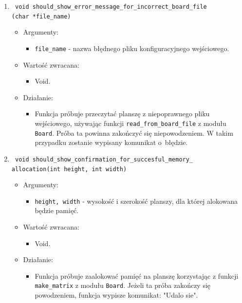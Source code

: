 \documentclass[a4paper,11pt, notitlepage ]{article}
\begin{document}
\begin{enumerate}
\item \verb+ void should_show_error_message_for_incorrect_board_file+ \\\verb+(char *file_name)+
\begin{itemize}
\item Argumenty:
\begin{itemize}
\item \verb+file_name+ - nazwa błędnego pliku konfiguracyjnego wejściowego.
\end{itemize}
\item Wartość zwracana:
\begin{itemize}
\item Void.
\end{itemize}
\item Działanie:
\begin{itemize}
\item Funkcja próbuje przeczytać planszę z niepoprawnego pliku wejściowego, używając funkcji \verb+read_from_board_file+ z modułu \verb+Board+. Próba ta powinna zakończyć się niepowodzeniem. W takim przypadku zostanie wypisany komunikat o~błędzie.
\end{itemize}
\end{itemize}


\item \verb+ void should_show_confirmation_for_succesful_memory_+\\\verb+allocation(int height, int width)+
\begin{itemize}
\item Argumenty:
\begin{itemize}
\item \verb+height, width+ - wysokość i szerokość planszy, dla której alokowana będzie pamięć.
\end{itemize}
\item Wartość zwracana:
\begin{itemize}
\item Void.
\end{itemize}
\item Działanie:
\begin{itemize}
\item Funkcja próbuje zaalokować pamięć na planszę korzystając z funkcji \verb+make_matrix+ z modułu \verb+Board+. Jeżeli ta próba zakończy się powodzeniem, funkcja wypisze komunikat: "Udalo sie".
\end{itemize}
\end{itemize}


\end{enumerate}
\end{document}
